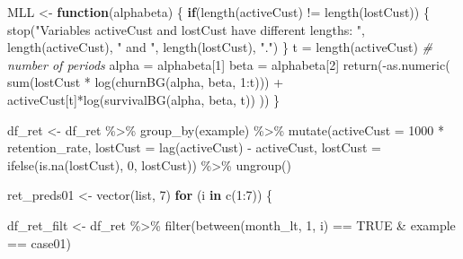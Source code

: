 \documentclass[
]{book}
\newenvironment{Shaded}{\begin{snugshade}}{\end{snugshade}}
\newcommand{\AttributeTok}[1]{\textcolor[rgb]{0.77,0.63,0.00}{#1}}
\newcommand{\CommentTok}[1]{\textcolor[rgb]{0.56,0.35,0.01}{\textit{#1}}}
\newcommand{\ConstantTok}[1]{\textcolor[rgb]{0.00,0.00,0.00}{#1}}
\newcommand{\ControlFlowTok}[1]{\textcolor[rgb]{0.13,0.29,0.53}{\textbf{#1}}}
\newcommand{\DecValTok}[1]{\textcolor[rgb]{0.00,0.00,0.81}{#1}}
\newcommand{\FunctionTok}[1]{\textcolor[rgb]{0.00,0.00,0.00}{#1}}
\newcommand{\NormalTok}[1]{#1}
\newcommand{\OtherTok}[1]{\textcolor[rgb]{0.56,0.35,0.01}{#1}}
\newcommand{\SpecialCharTok}[1]{\textcolor[rgb]{0.00,0.00,0.00}{#1}}
\newcommand{\StringTok}[1]{\textcolor[rgb]{0.31,0.60,0.02}{#1}}
\begin{document}
\begin{Shaded}
\begin{Highlighting}[]
\NormalTok{MLL }\OtherTok{\textless{}{-}} \ControlFlowTok{function}\NormalTok{(alphabeta) \{}
        \ControlFlowTok{if}\NormalTok{(}\FunctionTok{length}\NormalTok{(activeCust) }\SpecialCharTok{!=} \FunctionTok{length}\NormalTok{(lostCust)) \{}
                \FunctionTok{stop}\NormalTok{(}\StringTok{"Variables activeCust and lostCust have different lengths: "}\NormalTok{,}
                     \FunctionTok{length}\NormalTok{(activeCust), }\StringTok{" and "}\NormalTok{, }\FunctionTok{length}\NormalTok{(lostCust), }\StringTok{"."}\NormalTok{)}
\NormalTok{        \}}
\NormalTok{        t }\OtherTok{=} \FunctionTok{length}\NormalTok{(activeCust) }\CommentTok{\# number of periods}
\NormalTok{        alpha }\OtherTok{=}\NormalTok{ alphabeta[}\DecValTok{1}\NormalTok{]}
\NormalTok{        beta }\OtherTok{=}\NormalTok{ alphabeta[}\DecValTok{2}\NormalTok{]}
        \FunctionTok{return}\NormalTok{(}\SpecialCharTok{{-}}\FunctionTok{as.numeric}\NormalTok{(}
                \FunctionTok{sum}\NormalTok{(lostCust }\SpecialCharTok{*} \FunctionTok{log}\NormalTok{(}\FunctionTok{churnBG}\NormalTok{(alpha, beta, }\DecValTok{1}\SpecialCharTok{:}\NormalTok{t))) }\SpecialCharTok{+}
\NormalTok{                        activeCust[t]}\SpecialCharTok{*}\FunctionTok{log}\NormalTok{(}\FunctionTok{survivalBG}\NormalTok{(alpha, beta, t))}
\NormalTok{        ))}
\NormalTok{\}}
 
 
\NormalTok{df\_ret }\OtherTok{\textless{}{-}}\NormalTok{ df\_ret }\SpecialCharTok{\%\textgreater{}\%}
        \FunctionTok{group\_by}\NormalTok{(example) }\SpecialCharTok{\%\textgreater{}\%}
        \FunctionTok{mutate}\NormalTok{(}\AttributeTok{activeCust =} \DecValTok{1000} \SpecialCharTok{*}\NormalTok{ retention\_rate,}
               \AttributeTok{lostCust =} \FunctionTok{lag}\NormalTok{(activeCust) }\SpecialCharTok{{-}}\NormalTok{ activeCust,}
               \AttributeTok{lostCust =} \FunctionTok{ifelse}\NormalTok{(}\FunctionTok{is.na}\NormalTok{(lostCust), }\DecValTok{0}\NormalTok{, lostCust)) }\SpecialCharTok{\%\textgreater{}\%}
        \FunctionTok{ungroup}\NormalTok{()}
 
         
\NormalTok{ret\_preds01 }\OtherTok{\textless{}{-}} \FunctionTok{vector}\NormalTok{(}\StringTok{\textquotesingle{}list\textquotesingle{}}\NormalTok{, }\DecValTok{7}\NormalTok{)}
\ControlFlowTok{for}\NormalTok{ (i }\ControlFlowTok{in} \FunctionTok{c}\NormalTok{(}\DecValTok{1}\SpecialCharTok{:}\DecValTok{7}\NormalTok{)) \{}
         
\NormalTok{        df\_ret\_filt }\OtherTok{\textless{}{-}}\NormalTok{ df\_ret }\SpecialCharTok{\%\textgreater{}\%}
                \FunctionTok{filter}\NormalTok{(}\FunctionTok{between}\NormalTok{(month\_lt, }\DecValTok{1}\NormalTok{, i) }\SpecialCharTok{==} \ConstantTok{TRUE} \SpecialCharTok{\&}\NormalTok{ example }\SpecialCharTok{==} \StringTok{\textquotesingle{}case01\textquotesingle{}}\NormalTok{)}
         

\end{Highlighting}
\end{Shaded}
\end{document}
